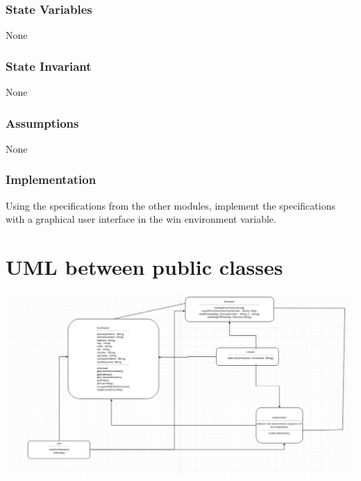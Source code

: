 \documentclass[12pt]{scrartcl}
\begin{document}
\subsubsection {State Variables}

None

\subsubsection {State Invariant}

None

\subsubsection {Assumptions}

None

\subsubsection {Implementation}

Using the specifications from the other modules, implement the specifications with a graphical user interface in the win environment variable.

\newpage 

\section {UML between public classes}


\begin{center}
\includegraphics[angle = 270, scale = 0.70]{uml.png}
\end{center}
\end{document}
